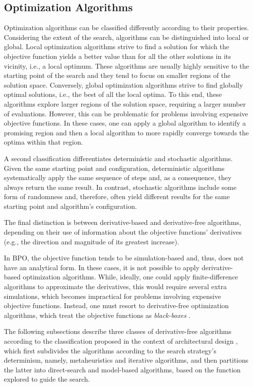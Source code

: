 \subsection{Optimization Algorithms}
Optimization algorithms can be classified differently according to their properties. Considering the extent of the search, algorithms can be distinguished into local or global. Local optimization algorithms strive to find a solution for which the objective function yields a better value than for all the other solutions in its vicinity, i.e., a local optimum. These algorithms are usually highly sensitive to the starting point of the search and they tend to focus on smaller regions of the solution space. Conversely, global optimization algorithms strive to find globally optimal solutions, i.e., the best of all the local optima. To this end, these algorithms explore larger regions of the solution space, requiring a larger number of evaluations. However, this can be problematic for problems involving expensive objective functions. In these cases, one can apply a global algorithm to identify a promising region and then a local algorithm to more rapidly converge towards the optima within that region. 

A second classification differentiates deterministic and stochastic algorithms. Given the same starting point and configuration, deterministic algorithms systematically apply the same sequence of steps and, as a consequence, they always return the same result. In contrast, stochastic algorithms include some form of randomness and, therefore, often yield different results for the same starting point and algorithm's configuration.

The final distinction is between derivative-based and derivative-free algorithms, depending on their use of information about the objective functions' derivatives (e.g., the direction and magnitude of its greatest increase). 

In \ac{BPO}, the objective function tends to be simulation-based and, thus, does not have an analytical form. In these cases, it is not possible to apply derivative-based optimization algorithms. While, ideally, one could apply finite-difference algorithms to approximate the derivatives, this would require several extra simulations, which becomes impractical for problems involving expensive objective functions. Instead, one must resort to derivative-free optimization algorithms, which treat the objective functions as \textit{black-boxes} \cite{Rios2013}.

The following subsections describe three classes of derivative-free algorithms according to the classification proposed in the context of architectural design \cite{Wortmann2017ADO}, which first subdivides the algorithms according to the search strategy's determinism, namely, metaheuristics and iterative algorithms, and then partitions the latter into direct-search and model-based algorithms, based on the function explored to guide the search. 

